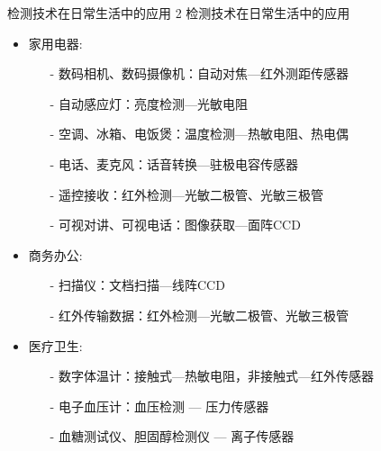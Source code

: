 \documentclass[10pt]{beamer}
\begin{document}
\begin{frame}{检测技术在日常生活中的应用}
2 检测技术在日常生活中的应用
    \begin{itemize}
        \item \alert{家用电器:}
        \begin{itemize}
            \item[-] 数码相机、数码摄像机：自动对焦---红外测距传感器
            \item[-] 自动感应灯：亮度检测---光敏电阻
            \item[-] 空调、冰箱、电饭煲：温度检测---热敏电阻、热电偶
            \item[-] 电话、麦克风：话音转换---驻极电容传感器
            \item[-]  遥控接收：红外检测---光敏二极管、光敏三极管
            \item[-] 可视对讲、可视电话：图像获取---面阵CCD
            

        \end{itemize}
        \item \alert{商务办公:}
        \begin{itemize}
            \item[-] 扫描仪：文档扫描---线阵CCD
            \item[-] 红外传输数据：红外检测---光敏二极管、光敏三极管
        \end{itemize}
        \item \alert{医疗卫生:}
        \begin{itemize}
            \item[-] 数字体温计：接触式---热敏电阻，非接触式---红外传感器
            \item[-]电子血压计：血压检测 --- 压力传感器
            \item[-] 血糖测试仪、胆固醇检测仪 --- 离子传感器
        \end{itemize}


    \end{itemize}
\end{frame}
\end{document}

